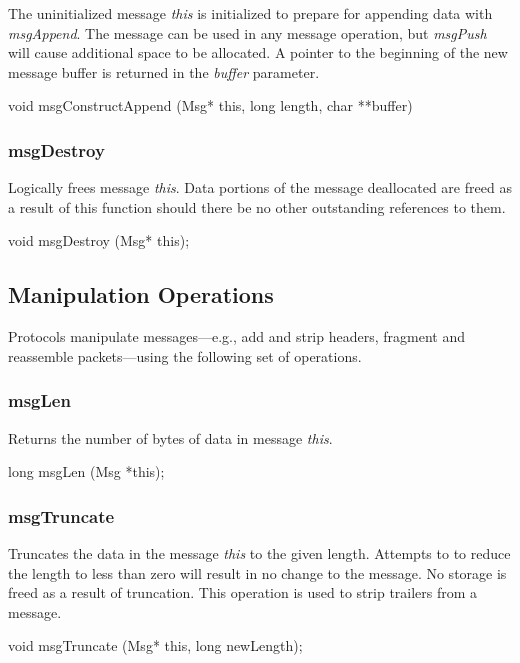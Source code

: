 The uninitialized message {\em this} is initialized to prepare for
appending data with {\em msgAppend}.  The message can be used in any
message operation, but {\em msgPush} will cause additional space to be
allocated.  A pointer to the beginning of the new message buffer is
returned in the {\em buffer} parameter.

\medskip

{\sem void} {\bold msgConstructAppend} ({\sem Msg*} {\caps this},
	{\sem long} {\caps length},
	{\sem char} **{\caps buffer})

\subsubsection{msgDestroy}

Logically frees message {\em this}. Data portions of the
message deallocated are freed as a result of this function
should there be no other outstanding references to them.
\medskip

{\sem void} {\bold msgDestroy} ({\sem Msg*} {\caps this});

\subsection{Manipulation Operations}

Protocols manipulate messages---e.g., add and strip headers, fragment
and reassemble packets---using the following set of operations.

\subsubsection{msgLen}

Returns the number of bytes of data in message {\em this}.
\medskip

{\sem long} {\bold msgLen} ({\sem Msg} *{\caps this});
\medskip

\subsubsection{msgTruncate}

Truncates the data in the message {\em this} to the given length.
Attempts to to reduce the length to less than zero will result in no
change to the message.  No storage is freed as a result of truncation.
This operation is used to strip trailers from a message.
\medskip

{\sem void} {\bold msgTruncate} ({\sem Msg*} {\caps this}, {\sem long} {\caps newLength});
\medskip

